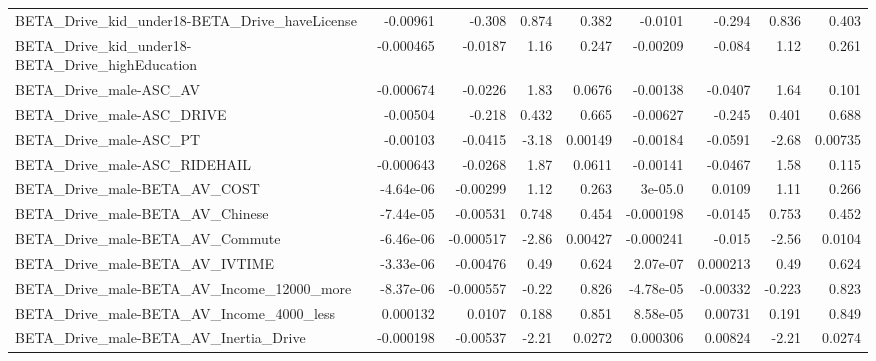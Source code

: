 \begin{tabular}{lrrrrrrrr}
BETA\_Drive\_kid\_under18-BETA\_Drive\_haveLicense      &    -0.00961 &       -0.308 &    0.874 &    0.382 &    -0.0101 &      -0.294 &        0.836 &         0.403 \\
BETA\_Drive\_kid\_under18-BETA\_Drive\_highEducation    &   -0.000465 &      -0.0187 &     1.16 &    0.247 &   -0.00209 &      -0.084 &         1.12 &         0.261 \\
BETA\_Drive\_male-ASC\_AV                             &   -0.000674 &      -0.0226 &     1.83 &   0.0676 &   -0.00138 &     -0.0407 &         1.64 &         0.101 \\
BETA\_Drive\_male-ASC\_DRIVE                          &    -0.00504 &       -0.218 &    0.432 &    0.665 &   -0.00627 &      -0.245 &        0.401 &         0.688 \\
BETA\_Drive\_male-ASC\_PT                             &    -0.00103 &      -0.0415 &    -3.18 &  0.00149 &   -0.00184 &     -0.0591 &        -2.68 &       0.00735 \\
BETA\_Drive\_male-ASC\_RIDEHAIL                       &   -0.000643 &      -0.0268 &     1.87 &   0.0611 &   -0.00141 &     -0.0467 &         1.58 &         0.115 \\
BETA\_Drive\_male-BETA\_AV\_COST                       &   -4.64e-06 &     -0.00299 &     1.12 &    0.263 &    3e-05.0 &      0.0109 &         1.11 &         0.266 \\
BETA\_Drive\_male-BETA\_AV\_Chinese                    &   -7.44e-05 &     -0.00531 &    0.748 &    0.454 &  -0.000198 &     -0.0145 &        0.753 &         0.452 \\
BETA\_Drive\_male-BETA\_AV\_Commute                    &   -6.46e-06 &    -0.000517 &    -2.86 &  0.00427 &  -0.000241 &      -0.015 &        -2.56 &        0.0104 \\
BETA\_Drive\_male-BETA\_AV\_IVTIME                     &   -3.33e-06 &     -0.00476 &     0.49 &    0.624 &   2.07e-07 &    0.000213 &         0.49 &         0.624 \\
BETA\_Drive\_male-BETA\_AV\_Income\_12000\_more          &   -8.37e-06 &    -0.000557 &    -0.22 &    0.826 &  -4.78e-05 &    -0.00332 &       -0.223 &         0.823 \\
BETA\_Drive\_male-BETA\_AV\_Income\_4000\_less           &    0.000132 &       0.0107 &    0.188 &    0.851 &   8.58e-05 &     0.00731 &        0.191 &         0.849 \\
BETA\_Drive\_male-BETA\_AV\_Inertia\_Drive              &   -0.000198 &     -0.00537 &    -2.21 &   0.0272 &   0.000306 &     0.00824 &        -2.21 &        0.0274 \\

\end{tabular}
